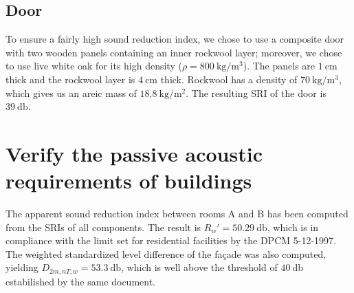 \documentclass[]{scrartcl}
\begin{document}
\subsection{Door}

To ensure a fairly high sound reduction index, we chose to use a composite door with two wooden panels containing an inner rockwool layer; moreover, we chose to use live white oak for its high density \cite{wood} ($\rho = \SI{800}{\kilogram\per\meter\cubed}$). The panels are $\SI{1}{\centi\meter}$ thick and the rockwool layer is $\SI{4}{\centi\meter}$ thick. Rockwool has a density of $\SI{70}{\kilogram\per\meter\cubed}$, which gives us an areic mass of $\SI{18.8}{\kilogram\per \meter\squared}$. The resulting SRI of the door is $\SI{39}{\decibel}$.

\section{Verify the passive acoustic requirements of buildings}  


The apparent sound reduction index between rooms A and B has been computed from the SRIs of all components. The result is $R_w' = \SI{50.29}{\decibel}$, which is in compliance with the limit set for residential facilities by the DPCM 5-12-1997. The weighted standardized level difference of the façade was also computed, yielding $D_{2m,nT,w} = \SI{53.3}{\decibel}$, which is well above the threshold of $\SI{40}{\decibel}$ estabilished by the same document.

\printbibliography
\end{document}
